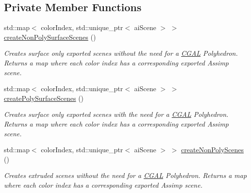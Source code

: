 \subsection*{Private Member Functions}
\begin{DoxyCompactItemize}
\item 
\mbox{\label{classpepr3d_1_1_model_exporter_a31cfba9f522ed35f2f25e1d88f5c0291}} 
std\+::map$<$ color\+Index, std\+::unique\+\_\+ptr$<$ ai\+Scene $>$ $>$ \mbox{\hyperlink{classpepr3d_1_1_model_exporter_a31cfba9f522ed35f2f25e1d88f5c0291}{create\+Non\+Poly\+Surface\+Scenes}} ()
\begin{DoxyCompactList}\small\item\em Creates surface only exported scenes without the need for a \mbox{\hyperlink{namespace_c_g_a_l}{C\+G\+AL}} Polyhedron. Returns a map where each color index has a corresponding exported Assimp scene. \end{DoxyCompactList}\item 
\mbox{\label{classpepr3d_1_1_model_exporter_aebf51f53d44f88e180a63900aedd386c}} 
std\+::map$<$ color\+Index, std\+::unique\+\_\+ptr$<$ ai\+Scene $>$ $>$ \mbox{\hyperlink{classpepr3d_1_1_model_exporter_aebf51f53d44f88e180a63900aedd386c}{create\+Poly\+Surface\+Scenes}} ()
\begin{DoxyCompactList}\small\item\em Creates surface only exported scenes with the need for a \mbox{\hyperlink{namespace_c_g_a_l}{C\+G\+AL}} Polyhedron. Returns a map where each color index has a corresponding exported Assimp scene. \end{DoxyCompactList}\item 
\mbox{\label{classpepr3d_1_1_model_exporter_aaf14c84e428fce47a5aefd330218e0c8}} 
std\+::map$<$ color\+Index, std\+::unique\+\_\+ptr$<$ ai\+Scene $>$ $>$ \mbox{\hyperlink{classpepr3d_1_1_model_exporter_aaf14c84e428fce47a5aefd330218e0c8}{create\+Non\+Poly\+Scenes}} ()
\begin{DoxyCompactList}\small\item\em Creates extruded scenes without the need for a \mbox{\hyperlink{namespace_c_g_a_l}{C\+G\+AL}} Polyhedron. Returns a map where each color index has a corresponding exported Assimp scene. \end{DoxyCompactList}\item 

\end{DoxyCompactItemize}
